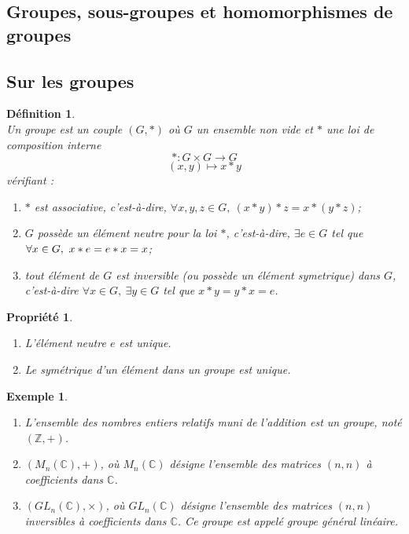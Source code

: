 \documentclass[a4paper, 14pt]{report}
\newtheorem{definition}{Définition}[section]
\newtheorem{example}{Exemple}[section]
\newtheorem{propriety}{Propriété}[section]
\begin{document}
\begin{onehalfspace}
{\section{Groupes, sous-groupes et homomorphismes de groupes}
\subsection{Sur les groupes}


\begin{definition} \cite{schaub1997} \\
Un groupe est un couple  $(G,*)$ où $G$ un ensemble non vide et $*$ une loi de composition interne
	\[
	* : G \times G \longrightarrow G
	\]
	\[
	(x, y) \longmapsto x * y
	\]
	vérifiant :
	\begin{enumerate} [label=\roman*)]
		\item $*$ est associative, c'est-à-dire, \(\forall x, y, z \in G, \ (x * y) * z = x * (y * z)\);
		\item $G$ possède un élément neutre pour la loi $*$, c'est-à-dire, \(\exists e \in G\) tel que \(\forall x \in G, \\ \ x * e = e * x = x\);
		\item tout  élément de $G$ est inversible (ou possède un  élément symetrique) dans $G$, c'est-à-dire \(\forall x \in G, \ \exists y \in G\) tel que \(x * y = y * x = e\).
	\end{enumerate}
\end{definition}

\begin{propriety} \cite{schaub1997}
	\begin{enumerate}[label=\roman*)]
		\item L'élément neutre \(e\) est unique.
		\item Le symétrique d'un élément dans un groupe est unique.
	\end{enumerate}
\end{propriety}

\begin{example} 
	\begin{enumerate} \
		\item L’ensemble des nombres entiers relatifs muni de l’addition est un groupe, noté \((\mathbb{Z}, +)\).
		\item \((M_n(\mathbb{C}), +)\), où \(M_n(\mathbb{C})\) désigne l’ensemble des matrices \((n, n)\) à coefficients dans \(\mathbb{C}\).
		\item \((GL_n(\mathbb{C}), \times)\), où \(GL_n(\mathbb{C})\) désigne l’ensemble des matrices \((n, n)\) inversibles à coefficients dans \(\mathbb{C}\). Ce groupe est appelé groupe général linéaire.
	\end{enumerate}
\end{example}


}
\end{onehalfspace}
\end{document}
